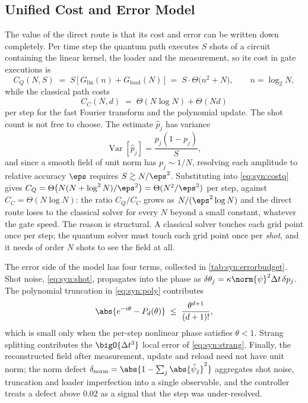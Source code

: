 \subsection{Unified Cost and Error Model}\label{sec:syn:costmodel}

The value of the direct route is that its cost and error can be written down completely. Per time step the quantum path executes $S$ shots of a circuit containing the linear kernel, the loader and the measurement, so its cost in gate executions is
\begin{equation}\label{eq:syn:costq}
  C_Q(N,S) \;=\; S\,\big[\,G_{\mathrm{lin}}(n) + G_{\mathrm{load}}(N)\,\big]
  \;=\; S\cdot\Theta\!\big(n^{2}+N\big),\qquad n=\log_2 N,
\end{equation}
while the classical path costs
\begin{equation}\label{eq:syn:costc}
  C_C(N,d) \;=\; \Theta(N\log N) + \Theta(Nd)
\end{equation}
per step for the fast Fourier transform and the polynomial update. The shot count is not free to choose. The estimate $\hat p_j$ has variance
\begin{equation}\label{eq:syn:shot}
  \operatorname{Var}[\hat p_j]=\frac{p_j(1-p_j)}{S},
\end{equation}
and since a smooth field of unit norm has $p_j\sim 1/N$, resolving each amplitude to relative accuracy $\eps$ requires $S\gtrsim N/\eps^{2}$. Substituting into \cref{eq:syn:costq} gives $C_Q=\Theta\big(N(N+\log^{2}N)/\eps^{2}\big)=\Theta(N^{2}/\eps^{2})$ per step, against $C_C=\Theta(N\log N)$: the ratio $C_Q/C_C$ grows as $N/(\eps^{2}\log N)$ and the direct route loses to the classical solver for every $N$ beyond a small constant, whatever the gate speed. The reason is structural. A classical solver touches each grid point once per step; the quantum solver must touch each grid point once per \emph{shot}, and it needs of order $N$ shots to see the field at all.

The error side of the model has four terms, collected in \cref{tab:syn:errorbudget}. Shot noise, \cref{eq:syn:shot}, propagates into the phase as $\delta\theta_j=\kappa\norm{\psi}^{2}\Delta t\,\delta p_j$. The polynomial truncation in \cref{eq:syn:poly} contributes
\begin{equation}\label{eq:syn:trunc}
  \abs{e^{-i\theta}-P_d(\theta)}\;\le\;\frac{\theta^{d+1}}{(d+1)!},
\end{equation}
which is small only when the per-step nonlinear phase satisfies $\theta<1$. Strang splitting contributes the $\bigO{\Delta t^{3}}$ local error of \cref{eq:syn:strang}. Finally, the reconstructed field after measurement, update and reload need not have unit norm; the norm defect $\delta_{\mathrm{norm}}=\abs{1-\sum_j\abs{\hat\psi_j}^{2}}$ aggregates shot noise, truncation and loader imperfection into a single observable, and the controller treats a defect above $0.02$ as a signal that the step was under-resolved.

